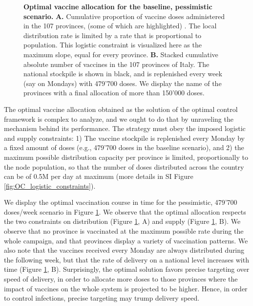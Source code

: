 \begin{figure}[!ht]
    \caption[Optimal vaccine allocation for the baseline, pessimistic scenario. ]{\textbf{Optimal vaccine allocation for the baseline, pessimistic scenario.} \textbf{A.} Cumulative proportion of vaccine doses administered in the 107 provinces, (some of which are highlighted) . The local distribution rate is limited by a rate that is proportional to population. This logistic constraint is visualized here as the maximum slope, equal for every province.
    \textbf{B.} Stacked cumulative absolute number of vaccines in the 107 provinces of Italy. The national stockpile is shown in black, and is replenished every week (say on Mondays) with 479'700 doses. We display the name of the provinces with a final allocation of more than 150'000 doses.}
    \label{fig:OC_stackplot}
\end{figure}

The optimal vaccine allocation obtained as the solution of the optimal control framework is complex to analyze, and we ought to do that by unraveling the mechanism behind its performance.
The strategy must obey the imposed logistic and supply constraints: 1) The vaccine stockpile is replenished every Monday by a fixed amount of doses (e.g., 479'700 doses in the baseline scenario), and 2) the maximum possible distribution capacity per province is limited, proportionally to the node population, so that the number of doses distributed across the country can be of 0.5M per day at maximum (more details in SI Figure \ref{fig:OC_logistic_constraints}). 

We display the optimal vaccination course in time for the pessimistic, 479'700 doses/week scenario in Figure \ref{fig:OC_stackplot}. We observe that the optimal allocation respects the two constraints on distribution (Figure \ref{fig:OC_stackplot}, A) and supply (Figure \ref{fig:OC_stackplot}, B). We observe that no province is vaccinated at the maximum possible rate during the whole campaign, and that provinces display a variety of vaccination patterns. We also note that the vaccines received every Monday are always distributed during the following week, but that the rate of delivery on a national level increases with time (Figure \ref{fig:OC_stackplot}, B). Surprisingly, the optimal solution favors precise targeting over speed of delivery, in order to allocate more doses to those provinces where the impact of vaccines on the whole system is projected to be higher. Hence, in order to control infections, precise targeting may trump delivery speed. 

